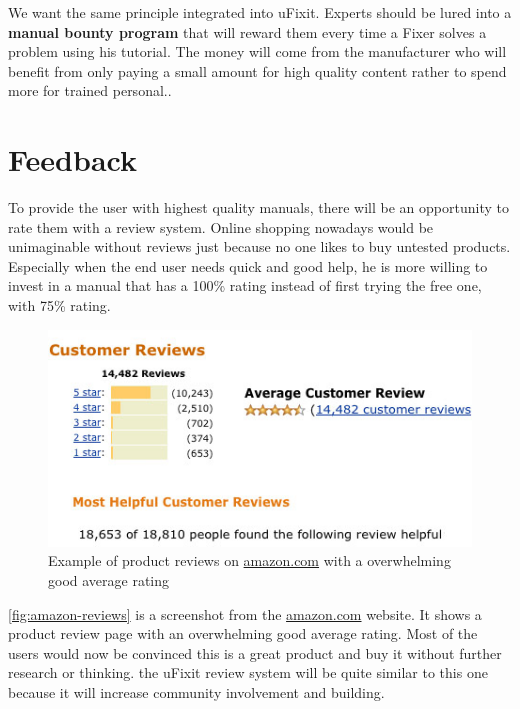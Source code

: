 		We want the same principle integrated into uFixit. Experts should be lured into a \textbf{manual bounty program} that will reward them every time a Fixer solves a problem using his tutorial. The money will come from the manufacturer who will benefit from only paying a small amount for high quality content rather to spend more for trained personal..
	
	\section{Feedback}
	
		To provide the user with highest quality manuals, there will be an opportunity to rate them with a review system. Online shopping nowadays would be unimaginable without reviews just because no one likes to buy untested products. Especially when the end user needs quick and good help, he is more willing to invest in a manual that has a 100\% rating instead of first trying the free one, with 75\% rating.

		\begin{figure}[H]
			\centering
			\includegraphics[width=0.7\linewidth]{../images/how-to-get-amazon-reviews-kindle.jpg}
			\caption{Example of product reviews on \url{amazon.com} with a overwhelming good average rating}
			\label{fig:amazon-reviews}
		\end{figure}
		
		\autoref{fig:amazon-reviews} is a screenshot from the \url{amazon.com} website. It shows a product review page with an overwhelming good average rating. Most of the users would now be convinced this is a great product and buy it without further research or thinking. the uFixit review system will be quite similar to this one because it will increase community involvement and building.
